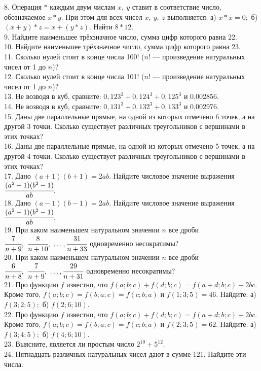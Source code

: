 8. Операция $*$ каждым двум числам $x,\ y$ ставит в соответствие число, обозначаемое $x*y.$ При этом для всех чисел $x,\ y,\ z$ выполняется: а) $x*x=0;$ б) $(x+y)*z=x+(y*z).$ Найти $8*12.$\\
9. Найдите наименьшее трёхзначное число, сумма цифр которого равна 22.\\
10. Найдите наименьшее трёхзначное число, сумма цифр которого равна 23.\\
11. Сколько нулей стоит в конце числа 100! ($n!$ --- произведение натуральных чисел от 1 до $n$)?\\
12. Сколько нулей стоит в конце числа 101! ($n!$ --- произведение натуральных чисел от 1 до $n$)?\\
13. Не возводя в куб, сравните: $0,123^3+0,124^3+0,125^3$ и 0,002856.\\
14. Не возводя в куб, сравните: $0,131^3+0,132^3+0,133^3$ и 0,002976.\\
15. Даны две параллельные прямые, на одной из которых отмечено 6 точек, а на другой 3 точки. Сколько существует различных треугольников с вершинами в этих точках?\\
16. Даны две параллельные прямые, на одной из которых отмечено 5 точек, а на другой 4 точки. Сколько существует различных треугольников с вершинами в этих точках?\\
17. Дано $(a+1)(b+1)=2ab.$ Найдите числовое значение выражения $\cfrac{(a^2-1)(b^2-1)}{ab}.$\\
18. Дано $(a-1)(b-1)=2ab.$ Найдите числовое значение выражения $\cfrac{(a^2-1)(b^2-1)}{ab}.$\\
19. При каком наименьшем натуральном значении $n$ все дроби $\cfrac{7}{n+9},\ \cfrac{8}{n+10},\ \ldots, \cfrac{31}{n+33}$ одновременно несократимы?\\
20. При каком наименьшем натуральном значении $n$ все дроби $\cfrac{6}{n+8},\ \cfrac{7}{n+9},\ \ldots, \cfrac{29}{n+31}$ одновременно несократимы?\\
21. Про функцию $f$ известно, что $f(a;b;c)+f(d;b;c)=f(a+d;b;c)+2bc.$ Кроме того, $f(a;b;c)=f(b;a;c)=f(c;b;a)$ и $f(1;3;5)=46.$ Найдите: а) $f(3;2;5);$
б) $f(2;6;10).$\\
22. Про функцию $f$ известно, что $f(a;b;c)+f(d;b;c)=f(a+d;b;c)+2bc.$ Кроме того, $f(a;b;c)=f(b;a;c)=f(c;b;a)$ и $f(2;3;5)=62.$ Найдите: а) $f(3;4;5);$
б) $f(4;6;10).$\\
23. Выясните, является ли простым число $2^{10}+5^{12}.$\\
24. Пятнадцать различных натуральных чисел дают в сумме 121. Найдите эти числа.\\

